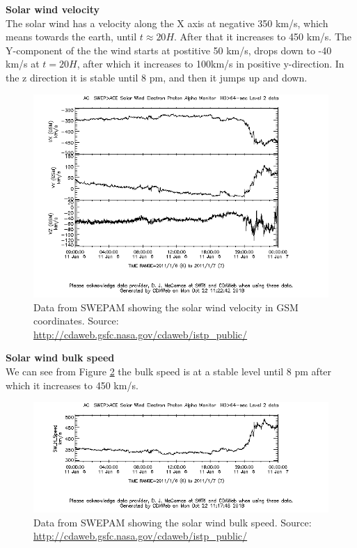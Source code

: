 \documentclass[norsk,a4paper,12pt]{article}
\begin{document}
\begin{multicols}{2}
\textbf{Solar wind velocity}\\
The solar wind has a velocity along the X axis at negative 350 km/s, which means towards the earth, until $t\approx 20 H$. After that it increases to 450 km/s. The Y-component of the the wind starts at postitive 50 km/s, drops down to -40 km/s at $t=20H$, after which it increases to 100km/s in positive y-direction. In the z direction it is stable until 8 pm, and then it jumps up and down.

\begin{figure}[H]
	\includegraphics[scale=0.4]{Figures/ACE_SE_velocityGSM.png}
	\centering
	\caption{Data from SWEPAM showing the solar wind velocity in GSM coordinates. Source: \url{http://cdaweb.gsfc.nasa.gov/cdaweb/istp_public/}}
	\label{fig:SWvelGSM}
\end{figure}


\textbf{Solar wind bulk speed}\\
We can see from Figure \ref{fig:ACE_bulk} the bulk speed is at a stable level until 8 pm after which it increases to 450 km/s.
\begin{figure}[H]
	\includegraphics[scale=0.4]{Figures/ACE_SW_H_Speed.png}
	\centering
	\caption{Data from SWEPAM showing the solar wind bulk speed. Source: \url{http://cdaweb.gsfc.nasa.gov/cdaweb/istp_public/}}
	\label{fig:ACE_bulk}
\end{figure}



\end{multicols}
\end{document}
